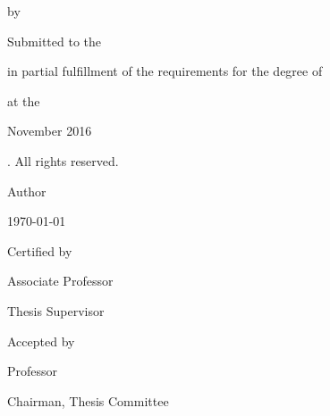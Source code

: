 \documentclass[
  12pt, %
  english, %
  doublespacing, %
]{setting} %
\author{Jack Smith} %
\newcommand\blankpage{
  \null
  \thispagestyle{empty}
  \addtocounter{page}{-1}
  \newpage
}
\begin{document}
\frontmatter %
\pagestyle{plain} %

\afterpage{\blankpage} %



\begin{titlepage}
  \begin{center} 
    {\Large \bfseries \ttitle \par}
    \bigskip
    {\normalsize by \par}
    \bigskip
    {\large \authorname \par}
    \bigskip
    {\normalsize Submitted to the \deptname \par in partial fulfillment of the requirements for the degree of \par}
    \bigskip
    {\large \degreename \par}
    \bigskip    
    {at the \par}
    \bigskip
    {\large \MakeUppercase{\univname} \par}
    \bigskip
    {\normalsize November 2016 \par}
    \bigskip
    {\textcopyright \space \univname {}. All rights reserved. \par}
    \bigskip \bigskip \bigskip 
    \begin{flushleft}
      {\large Author \dotfill \par}
    \end{flushleft}
    \begin{flushright} 
      {\deptname \par \today \par}
    \end{flushright}
    \begin{flushleft}
      {\large Certified by \dotfill \par}
    \end{flushleft}
    \begin{flushright} 
      {\supname \par Associate Professor \par Thesis Supervisor \par}
    \end{flushright}
    \begin{flushleft}
      {\large Accepted by \dotfill \par}
    \end{flushleft}
    \begin{flushright} 
      {\examname \par Professor \par Chairman, Thesis Committee \par}
    \end{flushright}
  \end{center}
\end{titlepage}
\end{document}
